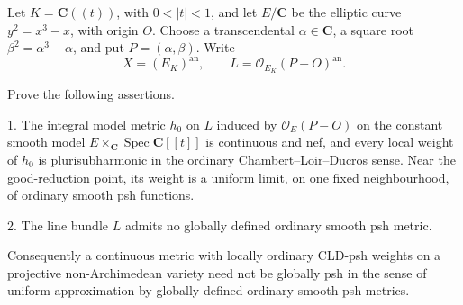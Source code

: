 Let \(K=\mathbf C((t))\), with \(0<|t|<1\), and let
\(E/\mathbf C\) be the elliptic curve \(y^2=x^3-x\), with origin \(O\).
Choose a transcendental \(\alpha\in\mathbf C\), a square root
\(\beta^2=\alpha^3-\alpha\), and put \(P=(\alpha,\beta)\).  Write
\[
  X=(E_K)^{\mathrm{an}},
  \qquad L=\mathcal O_{E_K}(P-O)^{\mathrm{an}}.
\]

Prove the following assertions.

1. The integral model metric \(h_0\) on \(L\) induced by
   \(\mathcal O_E(P-O)\) on the constant smooth model
   \(E\times_{\mathbf C}\operatorname{Spec}\mathbf C[[t]]\) is continuous
   and nef, and every local weight of \(h_0\) is plurisubharmonic in the
   ordinary Chambert--Loir--Ducros sense.  Near the good-reduction point,
   its weight is a uniform limit, on one fixed neighbourhood, of ordinary
   smooth psh functions.

2. The line bundle \(L\) admits no globally defined ordinary smooth psh
   metric.

Consequently a continuous metric with locally ordinary CLD-psh weights on
a projective non-Archimedean variety need not be globally psh in the sense
of uniform approximation by globally defined ordinary smooth psh metrics.
